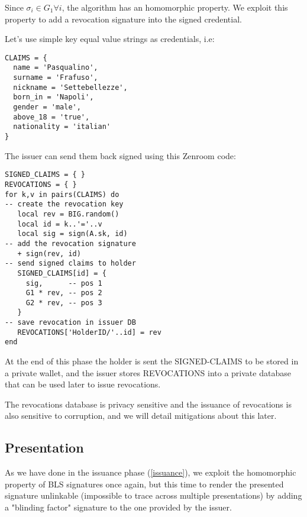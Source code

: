 \documentclass[conference]{IEEEtran}
\begin{document}
Since $\sigma_i\in G_1 \forall i$, the algorithm has an homomorphic
property. We exploit this property to add a revocation signature into
the signed credential.

Let's use simple key equal value strings as credentials, i.e:

\begin{lstlisting}[style=lua,caption={Holder requests signature of claims}]
CLAIMS = {
  name = 'Pasqualino',
  surname = 'Frafuso',
  nickname = 'Settebellezze',
  born_in = 'Napoli',
  gender = 'male',
  above_18 = 'true',
  nationality = 'italian'
}
\end{lstlisting}

The issuer can send them back signed using this Zenroom code:

\begin{lstlisting}[style=lua,caption={Issuer signs claims}]
SIGNED_CLAIMS = { }
REVOCATIONS = { }
for k,v in pairs(CLAIMS) do
-- create the revocation key
   local rev = BIG.random()
   local id = k..'='..v
   local sig = sign(A.sk, id)
-- add the revocation signature
   + sign(rev, id)
-- send signed claims to holder
   SIGNED_CLAIMS[id] = {
     sig,      -- pos 1
     G1 * rev, -- pos 2
     G2 * rev, -- pos 3
   }
-- save revocation in issuer DB
   REVOCATIONS['HolderID/'..id] = rev
end
\end{lstlisting}

At the end of this phase the holder is sent the SIGNED-CLAIMS
to be stored in a private wallet, and the issuer stores
REVOCATIONS into a private database that can be used later to
issue revocations.

The revocations database is privacy sensitive and the issuance of
revocations is also sensitive to corruption, and we will detail
mitigations about this later.

\subsection{Presentation}

As we have done in the issuance phase (\ref{issuance}), we exploit the
homomorphic property of BLS signatures once again, but this time to
render the presented signature unlinkable (impossible to trace across
multiple presentations) by adding a "blinding factor" signature to the
one provided by the issuer.

\end{document}
